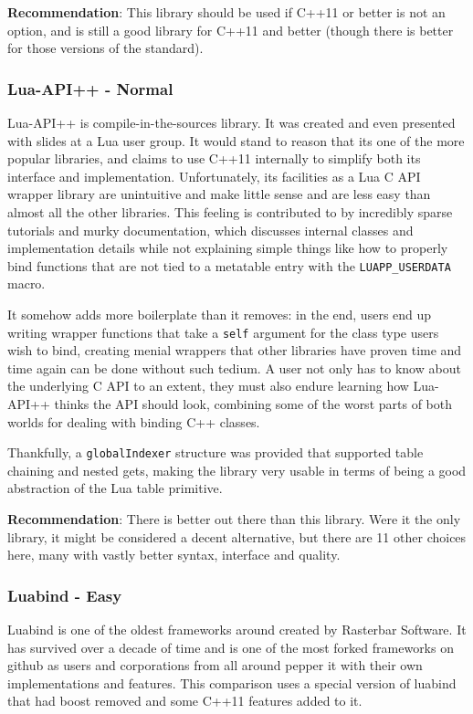\documentclass[conference,compsoc]{IEEEtran}
\begin{document}
\textbf{Recommendation}: This library should be used if C++11 or better is not an option, and is still a good library for C++11 and better (though there is better for those versions of the standard).

\subsubsection{Lua-API++ - Normal}

Lua-API++\cite{lua-api-pp} is compile-in-the-sources library. It was created and even presented with slides at a Lua user group. It would stand to reason that its one of the more popular libraries, and claims to use C++11 internally to simplify both its interface and implementation. Unfortunately, its facilities as a Lua C API wrapper library are unintuitive and make little sense and are less easy than almost all the other libraries. This feeling is contributed to by incredibly sparse tutorials and murky documentation, which discusses internal classes and implementation details while not explaining simple things like how to properly bind functions that are not tied to a metatable entry with the \lstinline|LUAPP_USERDATA| macro.

It somehow adds more boilerplate than it removes: in the end, users end up writing wrapper functions that take a \lstinline|self| argument for the class type users wish to bind, creating menial wrappers that other libraries have proven time and time again can be done without such tedium. A user not only has to know about the underlying C API to an extent, they must also endure learning how Lua-API++ thinks the API should look, combining some of the worst parts of both worlds for dealing with binding C++ classes.

Thankfully, a \lstinline|globalIndexer| structure was provided that supported table chaining and nested gets, making the library very usable in terms of being a good abstraction of the Lua table primitive.

\textbf{Recommendation}: There is better out there than this library. Were it the only library, it might be considered a decent alternative, but there are 11 other choices here, many with vastly better syntax, interface and quality.

\subsubsection{Luabind - Easy}

Luabind is one of the oldest frameworks around created by Rasterbar Software. It has survived over a decade of time and is one of the most forked frameworks on github as users and corporations from all around pepper it with their own implementations and features. This comparison uses a special version of luabind that had boost removed and some C++11 features added to it.
\end{document}
